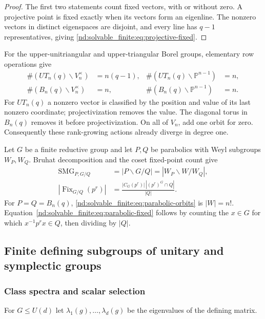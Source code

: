 \documentclass[10pt]{article}
\newcommand{\Fix}{\operatorname{Fix}}
\newcommand{\SMG}{\operatorname{SMG}}
\newcommand{\MGF}{\SMG}
\begin{document}
\begin{proof}
The first two statements count fixed vectors, with or without zero.  A
projective point is fixed exactly when its vectors form an eigenline.  The
nonzero vectors in distinct eigenspaces are disjoint, and every line has
$q-1$ representatives, giving \eqref{nd:solvable_finite:eq:projective-fixed}.
\end{proof}

For the upper-unitriangular and upper-triangular Borel groups, elementary row
operations give
\begin{align}
 \#(UT_n(q)\backslash V_n^\times)&=n(q-1),&
 \#(UT_n(q)\backslash\mathbb P^{n-1})&=n,\label{nd:solvable_finite:eq:ut-orbits}\\
 \#(B_n(q)\backslash V_n^\times)&=n,&
 \#(B_n(q)\backslash\mathbb P^{n-1})&=n.\label{nd:solvable_finite:eq:b-orbits}
\end{align}
For $UT_n(q)$ a nonzero vector is classified by the position and value of its
last nonzero coordinate; projectivization removes the value.  The diagonal
torus in $B_n(q)$ removes it before projectivization.  On all of $V_n$, add
one orbit for zero.  Consequently these rank-growing actions already diverge
in degree one.

Let $G$ be a finite reductive group and let $P,Q$ be parabolics with Weyl
subgroups $W_P,W_Q$.  Bruhat decomposition and the coset fixed-point count
give
\begin{align}
 [m_{(1)}]\MGF_{P,G/Q}&=|P\backslash G/Q|=|W_P\backslash W/W_Q|,
 \label{nd:solvable_finite:eq:parabolic-orbits}\\
 |\Fix_{G/Q}(p^r)|&=
 \frac{|C_G(p^r)|\,|(p^r)^G\cap Q|}{|Q|}.\label{nd:solvable_finite:eq:parabolic-fixed}
\end{align}
For $P=Q=B_n(q)$, \eqref{nd:solvable_finite:eq:parabolic-orbits} is $|W|=n!$.
Equation~\eqref{nd:solvable_finite:eq:parabolic-fixed} follows by counting the $x\in G$ for
which $x^{-1}p^rx\in Q$, then dividing by $|Q|$.

\subsection{Finite defining subgroups of unitary and symplectic groups}

\subsubsection{Class spectra and scalar selection}

For $G\leq U(d)$ let $\lambda_1(g),\ldots,\lambda_d(g)$ be the eigenvalues
of the defining matrix.
\end{document}
